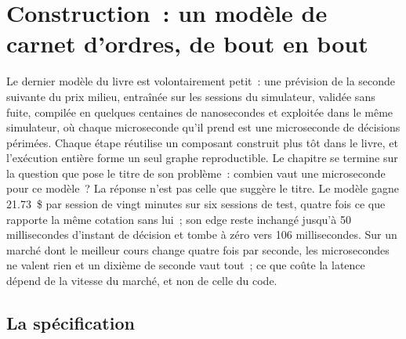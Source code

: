 \chapter{Construction~: un modèle de carnet d'ordres, de bout en bout}\label{ch:ml:build-an-order-book-model-end-to-end}

Le dernier modèle du livre est volontairement petit~: une prévision de la seconde suivante du prix milieu, entraînée sur les sessions du simulateur,
validée sans fuite, compilée en quelques centaines de nanosecondes et exploitée dans le même simulateur, où chaque microseconde
qu'il prend est une microseconde de décisions périmées. Chaque étape réutilise un composant construit plus tôt dans le livre, et l'exécution entière forme un seul
graphe reproductible. Le chapitre se termine sur la question que pose le titre de son problème~: combien vaut une microseconde pour ce modèle~?
La réponse n'est pas celle que suggère le titre. Le modèle gagne 21.73~\$ par session de vingt minutes sur six sessions de test, quatre fois
ce que rapporte la même cotation sans lui~; son edge reste inchangé jusqu'à 50 millisecondes d'instant de décision et tombe à zéro vers
106 millisecondes. Sur un marché dont le meilleur cours change quatre fois par seconde, les microsecondes ne valent rien et un dixième de
seconde vaut tout~; ce que coûte la latence dépend de la vitesse du marché, et non de celle du code.

\section{La spécification}

